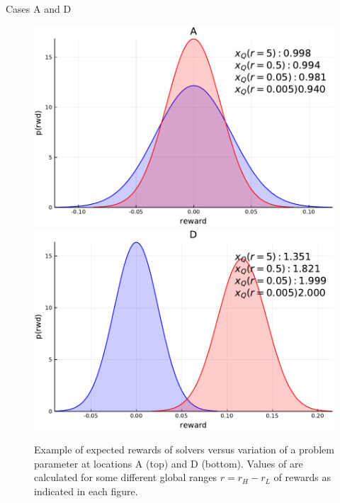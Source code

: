 \appendix
\newpage
\section{}
Cases A and D

\begin{figure}[h!]
    \centering
    \includegraphics[width=0.9\linewidth]{Figures/p2}\\
    \vspace{0.3cm}
    \includegraphics[width=0.9\linewidth]{Figures/p5}
    \caption{Example of expected rewards of solvers versus variation of a problem parameter at locations A (top) and D (bottom). Values of \xQ{} are calculated for some different global ranges $r=r_H-r_L$ of rewards as indicated in each figure.}
    \label{fig:sq_thry3}
\end{figure}

